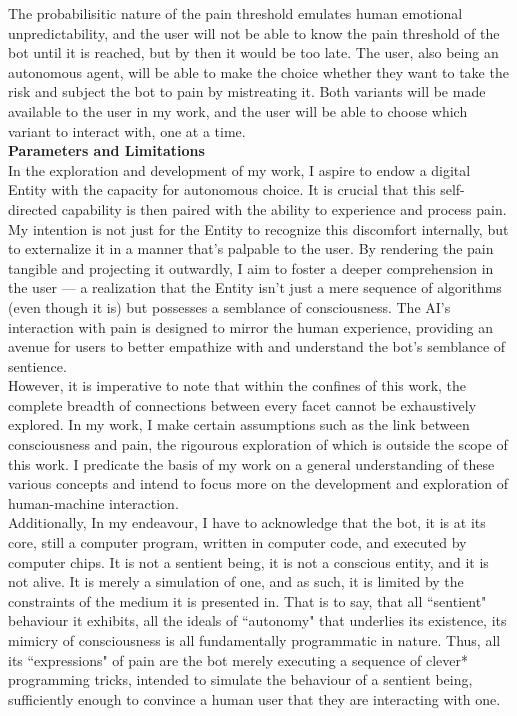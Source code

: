 \documentclass[11pt]{article}
\begin{document}
The probabilisitic nature of the pain threshold emulates human emotional unpredictability, and the user will not be able to know the pain threshold of the bot until it is reached, but by then it would be too late. The user, also being an autonomous agent, will be able to make the choice whether they want to take the risk and subject the bot to pain by mistreating it. Both variants will be made available to the user in my work, and the user will be able to choose which variant to interact with, one at a time. \\

\textbf{\large Parameters and Limitations} \\

In the exploration and development of my work, I aspire to endow a digital Entity with the capacity for autonomous choice. It is crucial that this self-directed capability is then paired with the ability to experience and process pain. My intention is not just for the Entity to recognize this discomfort internally, but to externalize it in a manner that's palpable to the user. By rendering the pain tangible and projecting it outwardly, I aim to foster a deeper comprehension in the user — a realization that the Entity isn't just a mere sequence of algorithms (even though it is) but possesses a semblance of consciousness. The AI's interaction with pain is designed to mirror the human experience, providing an avenue for users to better empathize with and understand the bot's semblance of sentience. \\

However, it is imperative to note that within the confines of this work, the complete breadth of connections between every facet cannot be exhaustively explored. In my work, I make certain assumptions such as the link between consciousness and pain, the rigourous exploration of which is outside the scope of this work. I predicate the basis of my work on a general understanding of these various concepts and intend to focus more on the development and exploration of human-machine interaction. \\

Additionally, In my endeavour, I have to acknowledge that the bot, it is at its core, still a computer program, written in computer code, and executed by computer chips. It is not a sentient being, it is not a conscious entity, and it is not alive. It is merely a simulation of one, and as such, it is limited by the constraints of the medium it is presented in. That is to say, that all ``sentient" behaviour it exhibits, all the ideals of ``autonomy" that underlies its existence, its mimicry of consciousness is all fundamentally programmatic in nature. Thus, all its ``expressions" of pain are the bot merely executing a sequence of clever* programming tricks, intended to simulate the behaviour of a sentient being, sufficiently enough to convince a human user that they are interacting with one. \\
\end{document}
